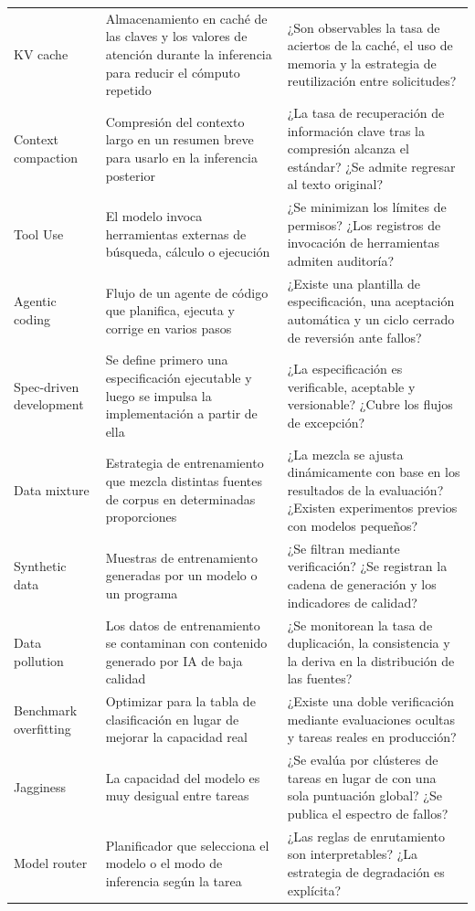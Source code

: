 \documentclass[a4paper]{article}
\begin{document}
\begin{longtable}{p{}p{}p{}}
KV cache & Almacenamiento en caché de las claves y los valores de atención durante la inferencia para reducir el cómputo repetido & ¿Son observables la tasa de aciertos de la caché, el uso de memoria y la estrategia de reutilización entre solicitudes? \\
Context compaction & Compresión del contexto largo en un resumen breve para usarlo en la inferencia posterior & ¿La tasa de recuperación de información clave tras la compresión alcanza el estándar? ¿Se admite regresar al texto original? \\
Tool Use & El modelo invoca herramientas externas de búsqueda, cálculo o ejecución & ¿Se minimizan los límites de permisos? ¿Los registros de invocación de herramientas admiten auditoría? \\
Agentic coding & Flujo de un agente de código que planifica, ejecuta y corrige en varios pasos & ¿Existe una plantilla de especificación, una aceptación automática y un ciclo cerrado de reversión ante fallos? \\
Spec-driven development & Se define primero una especificación ejecutable y luego se impulsa la implementación a partir de ella & ¿La especificación es verificable, aceptable y versionable? ¿Cubre los flujos de excepción? \\
Data mixture & Estrategia de entrenamiento que mezcla distintas fuentes de corpus en determinadas proporciones & ¿La mezcla se ajusta dinámicamente con base en los resultados de la evaluación? ¿Existen experimentos previos con modelos pequeños? \\
Synthetic data & Muestras de entrenamiento generadas por un modelo o un programa & ¿Se filtran mediante verificación? ¿Se registran la cadena de generación y los indicadores de calidad? \\
Data pollution & Los datos de entrenamiento se contaminan con contenido generado por IA de baja calidad & ¿Se monitorean la tasa de duplicación, la consistencia y la deriva en la distribución de las fuentes? \\
Benchmark overfitting & Optimizar para la tabla de clasificación en lugar de mejorar la capacidad real & ¿Existe una doble verificación mediante evaluaciones ocultas y tareas reales en producción? \\
Jagginess & La capacidad del modelo es muy desigual entre tareas & ¿Se evalúa por clústeres de tareas en lugar de con una sola puntuación global? ¿Se publica el espectro de fallos? \\
Model router & Planificador que selecciona el modelo o el modo de inferencia según la tarea & ¿Las reglas de enrutamiento son interpretables? ¿La estrategia de degradación es explícita? \\

\end{longtable}
\end{document}
